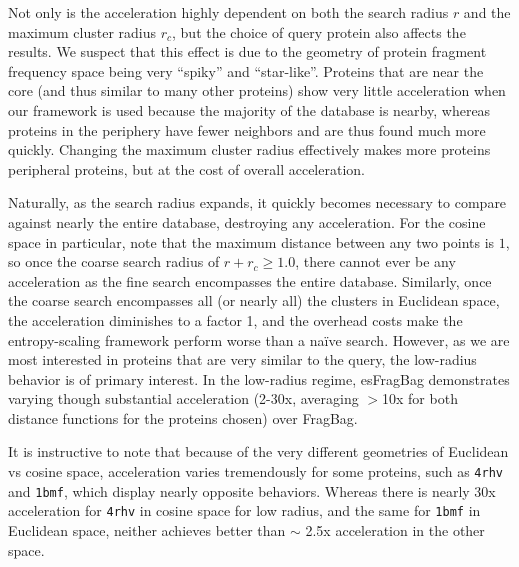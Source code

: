 \documentclass[review,preprint,12pt]{elsarticle}
\theoremstyle{definition}
\theoremstyle{remark}
\numberwithin{equation}{section}
\begin{document}
Not only is the acceleration highly dependent on both the search radius $r$ and the maximum cluster radius $r_c$,
but the choice of query protein also affects the results.
We suspect that this effect is due to the geometry of protein fragment frequency space being very ``spiky'' and ``star-like''.
Proteins that are near the core (and thus similar to many other proteins) show very little acceleration when our framework is used because the majority of the database is nearby, whereas proteins in the periphery have fewer neighbors and are thus found much more quickly.
Changing the maximum cluster radius effectively makes more proteins peripheral proteins, but at the cost of overall acceleration.

Naturally, as the search radius expands, it quickly becomes necessary to compare against nearly the entire database, destroying any acceleration.
For the cosine space in particular, note that the maximum distance between any two points is $1$, so once the coarse search radius of $r+r_c \ge 1.0$, there cannot ever be any acceleration as the fine search encompasses the entire database.
Similarly, once the coarse search encompasses all (or nearly all) the clusters in Euclidean space, the acceleration diminishes to a factor 1, and the overhead costs make the entropy-scaling framework perform worse than a na\"ive search.
However, as we are most interested in proteins that are very similar to the query, the low-radius behavior is of primary interest.
In the low-radius regime, esFragBag demonstrates varying though substantial acceleration (2-30x, averaging $>$10x for both distance functions for the proteins chosen) over FragBag.

It is instructive to note that because of the very different geometries of Euclidean vs cosine space, acceleration varies tremendously for some proteins, such as \texttt{4rhv} and \texttt{1bmf}, which display nearly opposite behaviors.
Whereas there is nearly 30x acceleration for \texttt{4rhv} in cosine space for low radius, and the same for \texttt{1bmf} in Euclidean space, neither achieves better than $\sim$ 2.5x acceleration in the other space.
\end{document}
